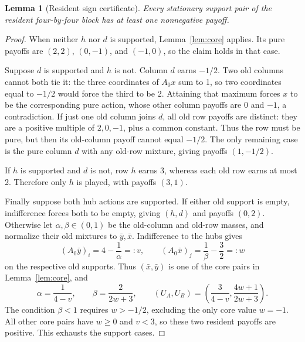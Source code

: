\documentclass[11pt,a4paper]{article}
\numberwithin{equation}{section}
\newtheorem{lemma}[theorem]{Lemma}
\theoremstyle{definition}
\begin{document}
\begin{lemma}[Resident sign certificate]\label{lem:sign}
Every stationary support pair of the resident four-by-four block has
at least one nonnegative payoff.
\end{lemma}
\begin{proof}
When neither \(h\) nor \(d\) is supported, Lemma~\ref{lem:core}
applies. Its pure payoffs are \((2,2)\), \((0,-1)\), and \((-1,0)\), so the claim
holds in that case.

Suppose \(d\) is supported and \(h\) is not. Column \(d\) earns
\(-1/2\). Two old columns cannot both tie it: the three coordinates
of \(A_0x\) sum to 1, so two coordinates equal to \(-1/2\) would
force the third to be 2. Attaining that maximum forces \(x\) to be
the corresponding pure action, whose other column payoffs are 0 and
\(-1\), a contradiction. If just one old column joins \(d\), all
old row payoffs are distinct: they are a positive multiple of
\(2,0,-1\), plus a common constant. Thus the row must be pure, but
then its old-column payoff cannot equal \(-1/2\). The only remaining
case is the pure column \(d\) with any old-row mixture, giving
payoffs \((1,-1/2)\).

If \(h\) is supported and \(d\) is not, row \(h\) earns 3, whereas
each old row earns at most 2. Therefore only \(h\) is played, with
payoffs \((3,1)\).

Finally suppose both hub actions are supported. If either old support
is empty, indifference forces both to be empty, giving \((h,d)\)
and payoffs \((0,2)\). Otherwise let \(\alpha,\beta\in(0,1)\)
be the old-column and old-row masses, and normalize their old mixtures
to \(\bar y,\bar x\). Indifference to the hubs gives
\[
 (A_0\bar y)_i=4-\frac1\alpha=:v,
 \qquad (A_0\bar x)_j=\frac1\beta-\frac32=:w
\]
on the respective old supports. Thus \((\bar x,\bar y)\) is one
of the core pairs in Lemma~\ref{lem:core}, and
\[
 \alpha=\frac1{4-v},\qquad \beta=\frac2{2w+3},\qquad
 (U_A,U_B)=\left(\frac3{4-v},\frac{4w+1}{2w+3}\right).
\]
The condition \(\beta<1\) requires \(w>-1/2\), excluding the
only core value \(w=-1\). All other core pairs have \(w\ge0\)
and \(v<3\), so these two resident payoffs are positive. This
exhausts the support cases.
\end{proof}
\end{document}
